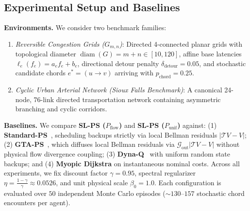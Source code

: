 \documentclass[11pt,a4paper]{article}
\begin{document}
\subsection{Experimental Setup and Baselines}
\textbf{Environments.} We consider two benchmark families:
\begin{enumerate}
    \item \textit{Reversible Congestion Grids ($G_{m,n}$)}: Directed 4-connected planar grids with topological diameter $\operatorname{diam}(G) = m + n \in [10, 120]$, affine base latencies $\ell_e(f_e) = a_e f_e + b_e$, directional detour penalty $\delta_{\text{detour}} = 0.05$, and stochastic candidate chords $e^* = (u \to v)$ arriving with $p_{\text{chord}} = 0.25$.
    \item \textit{Cyclic Urban Arterial Network (Sioux Falls Benchmark)}: A canonical 24-node, 76-link directed transportation network containing asymmetric branching and cyclic corridors.
\end{enumerate}

\textbf{Baselines.} We compare \textbf{SL-PS ($P_{\text{flow}}$)} and \textbf{SL-PS ($P_{\text{unif}}$)} against: (1) \textbf{Standard-PS}~\cite{moore1993prioritized}, scheduling backups strictly via local Bellman residuals $|\mathcal{T}V - V|$; (2) \textbf{GTA-PS}~\cite{gta_ps2025}, which diffuses local Bellman residuals via $\mathcal{G}_{\text{out}} |\mathcal{T}V - V|$ without physical flow divergence coupling; (3) \textbf{Dyna-Q}~\cite{peng1993efficient} with uniform random state backups; and (4) \textbf{Myopic Dijkstra} on instantaneous nominal costs. Across all experiments, we fix discount factor $\gamma = 0.95$, spectral regularizer $\eta = \frac{1-\gamma}{\gamma} \approx 0.0526$, and unit physical scale $\beta_0 = 1.0$. Each configuration is evaluated over $50$ independent Monte Carlo episodes ($\sim 130$--$157$ stochastic chord encounters per agent).
\end{document}
